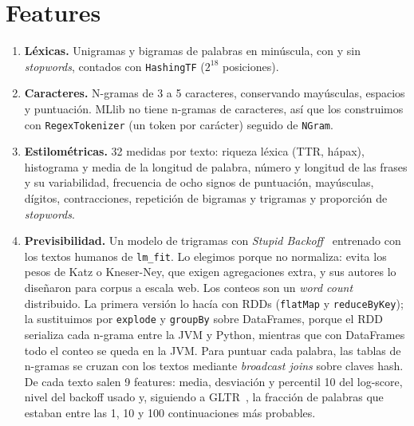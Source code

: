 \documentclass[runningheads]{llncs}
\begin{document}
\section{Features}

\begin{enumerate}

    \item \textbf{Léxicas.} Unigramas y bigramas de palabras en minúscula, con y sin
\emph{stopwords}, contados con \texttt{HashingTF} ($2^{18}$ posiciones).

\item \textbf{Caracteres.} N-gramas de 3 a 5 caracteres, conservando mayúsculas, espacios y
puntuación. MLlib no tiene n-gramas de caracteres, así que los construimos con
\texttt{RegexTokenizer} (un token por carácter) seguido de \texttt{NGram}.

\item \textbf{Estilométricas.} 32 medidas por texto: riqueza
léxica (TTR, hápax), histograma y media de la longitud de palabra, número y longitud de las
frases y su variabilidad, frecuencia de ocho signos de puntuación, mayúsculas, dígitos,
contracciones, repetición de bigramas y trigramas y proporción de \emph{stopwords}.

\item \textbf{Previsibilidad.} Un modelo de trigramas con \emph{Stupid
Backoff}~\cite{brants2007large} entrenado con los textos humanos de \texttt{lm\_fit}. Lo
elegimos porque no normaliza: evita los pesos de Katz o Kneser-Ney, que exigen agregaciones
extra, y sus autores lo diseñaron para corpus a escala web. Los
conteos son un \emph{word count} distribuido. La primera versión lo hacía con RDDs
(\texttt{flatMap} y \texttt{reduceByKey}); la sustituimos por \texttt{explode} y
\texttt{groupBy} sobre DataFrames, porque el RDD serializa cada n-grama entre la JVM y Python,
mientras que con DataFrames todo el conteo se queda en la JVM. Para puntuar cada palabra, las tablas de
n-gramas se cruzan con los textos mediante \emph{broadcast joins} sobre claves hash. De cada
texto salen 9 features: media, desviación y percentil 10 del log-score, nivel del
backoff usado y, siguiendo a GLTR~\cite{gehrmann2019gltr}, la fracción de palabras que estaban
entre las 1, 10 y 100 continuaciones más probables.
\end{enumerate}

\end{document}
